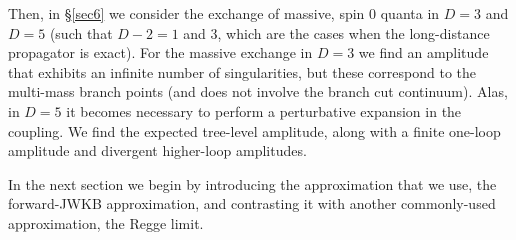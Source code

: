 Then, in \S\ref{sec6} we consider the exchange of massive, spin $0$ quanta in $D = 3$ and $D = 5$ (such that $D - 2 = 1$ and $3$, which are the cases when the long-distance propagator is exact). For the massive exchange in $D = 3$ we find an amplitude that exhibits an infinite number of singularities, but these correspond to the multi-mass branch points (and does not involve the branch cut continuum). Alas, in $D = 5$ it becomes necessary to perform a perturbative expansion in the coupling. We find the expected tree-level amplitude, along with a finite one-loop amplitude and divergent higher-loop amplitudes.

In the next section we begin by introducing the approximation that we use, the forward-JWKB approximation, and contrasting it with another commonly-used approximation, the Regge limit.